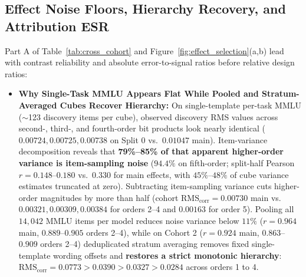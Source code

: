 \documentclass[11pt,a4paper]{article}
\begin{document}
\subsection{Effect Noise Floors, Hierarchy Recovery, and Attribution ESR}
Part A of Table~\ref{tab:cross_cohort} and Figure~\ref{fig:effect_selection}(a,b) lead with contrast reliability and absolute error-to-signal ratios before relative design ratios:
\begin{itemize}[leftmargin=*,nosep]
    \item \textbf{Why Single-Task MMLU Appears Flat While Pooled and Stratum-Averaged Cubes Recover Hierarchy:} On single-template per-task MMLU ($\sim$123 discovery items per cube), observed discovery RMS values across second-, third-, and fourth-order bit products look nearly identical ($0.00724, 0.00725, 0.00738$ on Split 0 vs.\ $0.01047$ main). Item-variance decomposition reveals that \textbf{79\%--85\% of that apparent higher-order variance is item-sampling noise} ($94.4\%$ on fifth-order; split-half Pearson $r = 0.148$--$0.180$ vs.\ $0.330$ for main effects, with $45\%$--$48\%$ of cube variance estimates truncated at zero). Subtracting item-sampling variance cuts higher-order magnitudes by more than half (cohort $\mathrm{RMS}_{\mathrm{corr}} = 0.00730$ main vs.\ $0.00321, 0.00309, 0.00384$ for orders 2--4 and $0.00163$ for order 5). Pooling all $14{,}042$ MMLU items per model reduces noise variance below $11\%$ ($r = 0.964$ main, $0.889$--$0.905$ orders 2--4), while on Cohort 2 ($r = 0.924$ main, $0.863$--$0.909$ orders 2--4) deduplicated stratum averaging removes fixed single-template wording offsets and \textbf{restores a strict monotonic hierarchy}: $\mathrm{RMS}_{\mathrm{corr}} = 0.0773 > 0.0390 > 0.0327 > 0.0284$ across orders 1 to 4.

\end{itemize}
\end{document}
